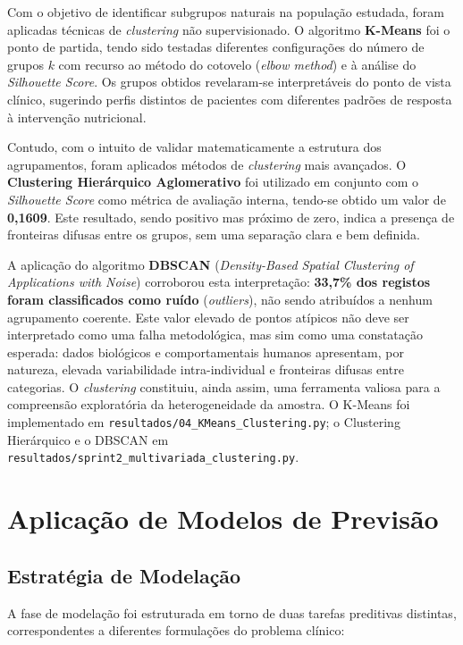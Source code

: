 Com o objetivo de identificar subgrupos naturais na população estudada, foram aplicadas técnicas de \textit{clustering} não supervisionado. O algoritmo \textbf{K-Means} foi o ponto de partida, tendo sido testadas diferentes configurações do número de grupos $k$ com recurso ao método do cotovelo (\textit{elbow method}) e à análise do \textit{Silhouette Score}. Os grupos obtidos revelaram-se interpretáveis do ponto de vista clínico, sugerindo perfis distintos de pacientes com diferentes padrões de resposta à intervenção nutricional.

Contudo, com o intuito de validar matematicamente a estrutura dos agrupamentos, foram aplicados métodos de \textit{clustering} mais avançados. O \textbf{Clustering Hierárquico Aglomerativo} foi utilizado em conjunto com o \textit{Silhouette Score} como métrica de avaliação interna, tendo-se obtido um valor de \textbf{0,1609}. Este resultado, sendo positivo mas próximo de zero, indica a presença de fronteiras difusas entre os grupos, sem uma separação clara e bem definida.

A aplicação do algoritmo \textbf{DBSCAN} (\textit{Density-Based Spatial Clustering of Applications with Noise}) corroborou esta interpretação: \textbf{33,7\% dos registos foram classificados como ruído} (\textit{outliers}), não sendo atribuídos a nenhum agrupamento coerente. Este valor elevado de pontos atípicos não deve ser interpretado como uma falha metodológica, mas sim como uma constatação esperada: dados biológicos e comportamentais humanos apresentam, por natureza, elevada variabilidade intra-individual e fronteiras difusas entre categorias. O \textit{clustering} constituiu, ainda assim, uma ferramenta valiosa para a compreensão exploratória da heterogeneidade da amostra. O K-Means foi implementado em \texttt{resultados/04\_KMeans\_Clustering.py}; o Clustering Hierárquico e o DBSCAN em \texttt{resultados/sprint2\_multivariada\_clustering.py}.


\section{Aplicação de Modelos de Previsão}
\label{sec:modelos}

\subsection{Estratégia de Modelação}

A fase de modelação foi estruturada em torno de duas tarefas preditivas distintas, correspondentes a diferentes formulações do problema clínico:

